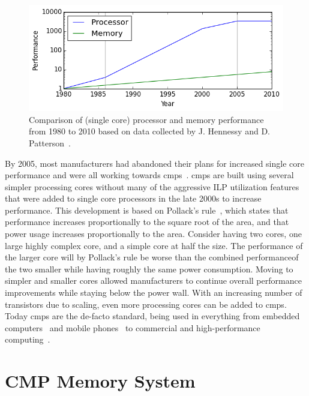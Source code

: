 \begin{figure}[ht]
\centering
\includegraphics[width=.8\textwidth]{figures/introduction/memory-gap}
\caption[Processor-Memory Gap]{Comparison of (single core) processor and memory performance from 1980 to 2010 based on data collected by J. Hennessy and D. Patterson~\cite{hennessy2012}.}
\label{fig:introduction:memgap}
\end{figure}

By 2005, most manufacturers had abandoned their plans for increased single core performance and were all working towards \glspl{cmp}~\cite{Sutter2005}.
\glspl{cmp} are built using several simpler processing cores without many of the aggressive ILP utilization features that were added to single core processors in the late 2000s to increase performance.
This development is based on Pollack's rule~\cite{Borkar2007}, which states that performance increases proportionally to the square root of the area, and that power usage increases proportionally to the area.
Consider having two cores, one large highly complex core, and a simple core at half the size.
The performance of the larger core will by Pollack's rule be worse than the combined performance\footnotemark of the two smaller while having roughly the same power consumption.
Moving to simpler and smaller cores allowed manufacturers to continue overall performance improvements while staying below the power wall.
With an increasing number of transistors due to scaling, even more processing cores can be added to \glspl{cmp}.
Today \glspl{cmp} are the de-facto standard, being used in everything from embedded computers~\cite{ARM2010} and mobile phones~\cite{Ho2014} to commercial and high-performance computing~\cite{Thomadakis2011, Jain2013}.


\section{CMP Memory System}

